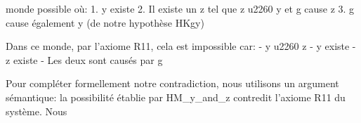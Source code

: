 \documentclass[10pt]{report}
\begin{document}
\begin{coqdoccode}
\begin{coqdoccomment}
monde\coqdocindent{0.50em}
possible\coqdocindent{0.50em}
où:\coqdoceol
\coqdocindent{2.50em}
1.\coqdocindent{0.50em}
y\coqdocindent{0.50em}
existe\coqdoceol
\coqdocindent{2.50em}
2.\coqdocindent{0.50em}
Il\coqdocindent{0.50em}
existe\coqdocindent{0.50em}
un\coqdocindent{0.50em}
z\coqdocindent{0.50em}
tel\coqdocindent{0.50em}
que\coqdocindent{0.50em}
z\coqdocindent{0.50em}
u2260\coqdocindent{0.50em}
y\coqdocindent{0.50em}
et\coqdocindent{0.50em}
g\coqdocindent{0.50em}
cause\coqdocindent{0.50em}
z\coqdoceol
\coqdocindent{2.50em}
3.\coqdocindent{0.50em}
g\coqdocindent{0.50em}
cause\coqdocindent{0.50em}
également\coqdocindent{0.50em}
y\coqdocindent{0.50em}
(de\coqdocindent{0.50em}
notre\coqdocindent{0.50em}
hypothèse\coqdocindent{0.50em}
HKgy)\coqdocindent{0.50em}
\end{coqdoccomment}
\coqdoceol
\coqdocindent{1.00em}
\coqdoceol
\coqdocindent{1.00em}
\begin{coqdoccomment}
\coqdocindent{0.50em}
Dans\coqdocindent{0.50em}
ce\coqdocindent{0.50em}
monde,\coqdocindent{0.50em}
par\coqdocindent{0.50em}
l'axiome\coqdocindent{0.50em}
R11,\coqdocindent{0.50em}
cela\coqdocindent{0.50em}
est\coqdocindent{0.50em}
impossible\coqdocindent{0.50em}
car:\coqdoceol
\coqdocindent{2.50em}
-\coqdocindent{0.50em}
y\coqdocindent{0.50em}
u2260\coqdocindent{0.50em}
z\coqdoceol
\coqdocindent{2.50em}
-\coqdocindent{0.50em}
y\coqdocindent{0.50em}
existe\coqdoceol
\coqdocindent{2.50em}
-\coqdocindent{0.50em}
z\coqdocindent{0.50em}
existe\coqdoceol
\coqdocindent{2.50em}
-\coqdocindent{0.50em}
Les\coqdocindent{0.50em}
deux\coqdocindent{0.50em}
sont\coqdocindent{0.50em}
causés\coqdocindent{0.50em}
par\coqdocindent{0.50em}
g\coqdocindent{0.50em}
\end{coqdoccomment}
\coqdoceol
\coqdocindent{1.00em}
\coqdoceol
\coqdocindent{1.00em}
\begin{coqdoccomment}
\coqdocindent{0.50em}
Pour\coqdocindent{0.50em}
compléter\coqdocindent{0.50em}
formellement\coqdocindent{0.50em}
notre\coqdocindent{0.50em}
contradiction,\coqdocindent{0.50em}
nous\coqdocindent{0.50em}
utilisons\coqdocindent{0.50em}
un\coqdocindent{0.50em}
argument\coqdocindent{0.50em}
sémantique:\coqdoceol
\coqdocindent{2.50em}
la\coqdocindent{0.50em}
possibilité\coqdocindent{0.50em}
établie\coqdocindent{0.50em}
par\coqdocindent{0.50em}
HM\_y\_and\_z\coqdocindent{0.50em}
contredit\coqdocindent{0.50em}
l'axiome\coqdocindent{0.50em}
R11\coqdocindent{0.50em}
du\coqdocindent{0.50em}
système.\coqdoceol
\coqdocindent{2.50em}
\coqdoceol
\coqdocindent{2.50em}
Nous\coqdocindent{0.50em}

\end{coqdoccomment}
\end{coqdoccode}
\end{document}
